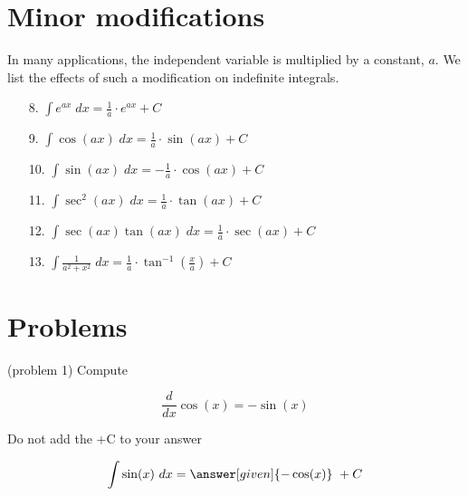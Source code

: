 \documentclass{ximera}
\begin{document}
\section{Minor modifications}

In many applications, the independent variable is multiplied by a constant, $a$. 
We list the effects of such a modification on indefinite integrals.

\begin{enumerate}

\item[8.] $\displaystyle{\int e^{ax} \; dx = \frac{1}{a} \cdot e^{ax} + C}$


\item[9.] $\displaystyle{\int \cos(ax) \; dx = \frac{1}{a} \cdot \sin(ax) + C}$

\item[10.] $\displaystyle{\int \sin(ax) \; dx = -\frac{1}{a} \cdot \cos(ax) + C}$

\item[11.] $\displaystyle{\int \sec^2(ax) \; dx = \frac{1}{a} \cdot \tan(ax) + C}$

\item[12.] $\displaystyle{\int \sec(ax)\tan(ax) \; dx = \frac{1}{a} \cdot \sec(ax) + C}$

\item[13.] $\displaystyle{\int \frac{1}{a^2 + x^2} \; dx = \frac{1}{a} \cdot \tan^{-1}\left(\frac{x}{a}\right) + C}$

\end{enumerate}



\section{Problems}






\begin{problem}(problem 1)
Compute
\begin{hint}
\[
\frac{d}{dx} \cos(x) = -\sin(x)
\]
\end{hint}
\begin{hint}
\begin{center}
Do not add the +C to your answer
\end{center}
\end{hint}

\[
\int \sin(x) \ dx =
\answer[given]{-\cos(x)} \ + C
\]
\end{problem}
\end{document}
